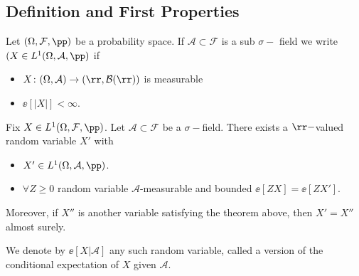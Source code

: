 \documentclass[../main.tex]{subfiles}
\begin{document}
\subsection{Definition and First Properties}
Let $(\Omega, \mathcal{F}, \pp)$ be a probability space. If $\mathcal{A}
\subset \mathcal{F}$ is a sub $\sigma-$ field we write $(X \in L^1(\Omega,
\mathcal{A}, \pp)$ if
\begin{itemize}
  \item $X\colon (\Omega, \mathcal{A}) \to (\rr, \mathcal{B}(\rr))$ is
    measurable
  \item $\ee[|X|] < \infty$.
\end{itemize}
\begin{theorem}
  \label{thm:condexp}
  Fix $X \in L^1(\Omega, \mathcal{F}, \pp)$. Let $\mathcal{A} \subset
  \mathcal{F}$ be a $\sigma-$field. There exists a $\rr-$valued random
  variable $X'$ with
  \begin{itemize}
    \item $X' \in L^1(\Omega, \mathcal{A}, \pp)$.
    \item $\forall Z \geq 0$ random variable $\mathcal{A}$-measurable and bounded
      $\ee[ZX] = \ee[ZX']$.
  \end{itemize}
\end{theorem}   
Moreover, if $X''$ is another variable satisfying the theorem above, then $X' =
X''$ almost surely.

\vspace{0.5em}\noindent

We denote by $\ee[X | \mathcal{A}]$ any such random variable, called a version
of the conditional expectation of $X$ given $\mathcal{A}$.
\end{document}

